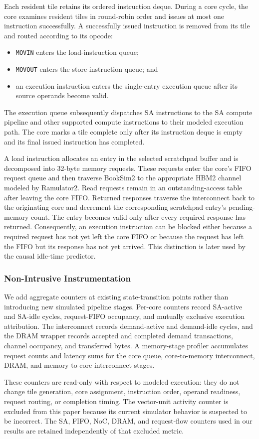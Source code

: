 Each resident tile retains its ordered instruction deque. During a core
cycle, the core examines resident tiles in round-robin order and issues at
most one instruction successfully. A successfully issued instruction is
removed from its tile and routed according to its opcode:
\begin{itemize}
  \item \texttt{MOVIN} enters the load-instruction queue;
  \item \texttt{MOVOUT} enters the store-instruction queue; and
  \item an execution instruction enters the single-entry execution queue
        after its source operands become valid.
\end{itemize}
The execution queue subsequently dispatches SA instructions to the SA compute
pipeline and other supported compute instructions to their modeled execution
path. The core marks a tile complete only after its instruction deque is empty
and its final issued instruction has completed.

A load instruction allocates an entry in the selected scratchpad buffer and
is decomposed into 32-byte memory requests. These requests enter the core's
FIFO request queue and then traverse BookSim2 to the appropriate HBM2 channel
modeled by Ramulator2. Read requests remain in an outstanding-access table
after leaving the core FIFO. Returned responses traverse the interconnect back
to the originating core and decrement the corresponding scratchpad entry's
pending-memory count. The entry becomes valid only after every required
response has returned. Consequently, an execution instruction can be blocked
either because a required request has not yet left the core FIFO or because
the request has left the FIFO but its response has not yet arrived. This
distinction is later used by the causal idle-time predictor.

\subsubsection{Non-Intrusive Instrumentation}

We add aggregate counters at existing state-transition points rather than
introducing new simulated pipeline stages. Per-core counters record SA-active
and SA-idle cycles, request-FIFO occupancy, and mutually exclusive execution
attribution. The interconnect records demand-active and demand-idle cycles,
and the DRAM wrapper records accepted and completed demand transactions,
channel occupancy, and transferred bytes. A memory-stage profiler accumulates
request counts and latency sums for the core queue, core-to-memory
interconnect, DRAM, and memory-to-core interconnect stages.

These counters are read-only with respect to modeled execution: they do not
change tile generation, core assignment, instruction order, operand
readiness, request routing, or completion timing. The vector-unit activity
counter is excluded from this paper because its current simulator behavior is
suspected to be incorrect. The SA, FIFO, NoC, DRAM, and request-flow counters
used in our results are retained independently of that excluded metric.
